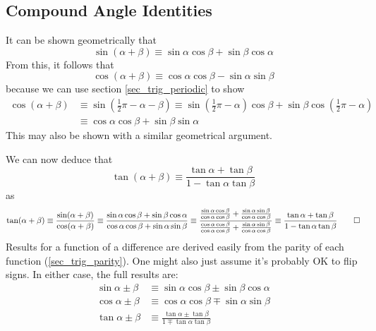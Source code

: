 \documentclass[fleqn,a4paper,11pt]{article}
\begin{document}
    \subsection{Compound Angle Identities} \label{sec_comp_angle}


    It can be shown geometrically that
    \begin{equation}
    \sin(\alpha + \beta) \equiv
       \sin \alpha \cos \beta +  \sin \beta \cos \alpha
    \end{equation}
    From this, it follows that
    \begin{equation}
    \cos(\alpha + \beta) \equiv
       \cos \alpha \cos \beta - \sin \alpha \sin \beta
    \end{equation}
    because we can use section \ref{sec_trig_periodic} to show
    \begin{align*}
    \cos(\alpha + \beta) &\equiv
        \sin(\frac 12 \pi - \alpha - \beta) \equiv
        \sin(\frac 12 \pi - \alpha)\cos \beta +
            \sin \beta \cos(\frac 12 \pi - \alpha) \\
    &\equiv
        \cos \alpha \cos \beta + \sin \beta \sin \alpha
    \end{align*}
    This may also be shown with a similar geometrical argument.

    We can now deduce that
    \begin{equation}
    \tan(\alpha + \beta) \equiv
        \frac{\tan \alpha + \tan \beta}{1 - \tan \alpha \tan \beta}
    \end{equation}
    as
    \begin{equation*}
    \tan(\alpha + \beta) \equiv
        \frac{\sin(\alpha + \beta)}{\cos(\alpha + \beta)} \equiv
        \frac{\sin \alpha \cos \beta + \sin \beta \cos \alpha}
             {\cos \alpha \cos \beta + \sin \alpha \sin \beta} \equiv
        \frac{\frac{\sin \alpha \cos \beta}{\cos \alpha \cos \beta} +
              \frac{\sin \alpha \sin \beta}{\cos \alpha \cos \beta}}
             {\frac{\cos \alpha \cos \beta}{\cos \alpha \cos \beta} +
              \frac{\sin \alpha \sin \beta}{\cos \alpha \cos \beta}}
             \equiv
        \frac{\tan \alpha + \tan \beta}{1 - \tan \alpha \tan \beta} \qed
    \end{equation*}
    Results for a function of a difference are derived easily from the parity of
    each function (\ref{sec_trig_parity}). One might also just assume it's
    probably OK to flip signs. In either case, the full results are:
    \begin{align}
    \sin \alpha \pm \beta &\equiv
       \sin \alpha \cos \beta \pm \sin \beta \cos \alpha \\
    \cos \alpha \pm \beta &\equiv
       \cos \alpha \cos \beta \mp \sin \alpha \sin \beta \\
    \tan \alpha \pm \beta &\equiv
        \frac{\tan \alpha \pm \tan \beta}{1 \mp \tan \alpha \tan \beta}
    \end{align}
\end{document}
